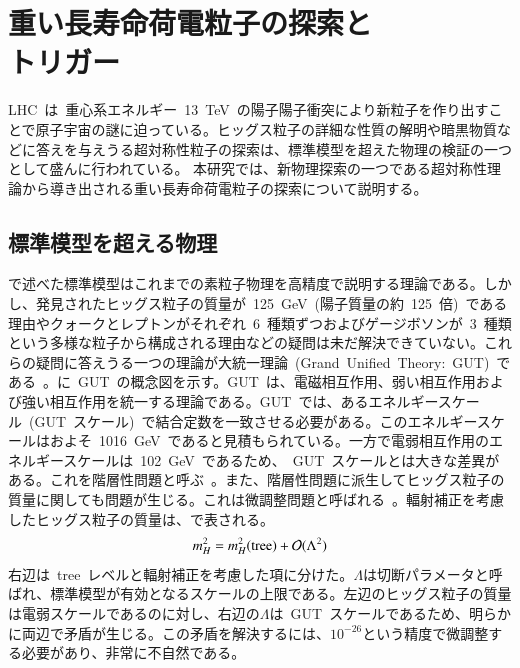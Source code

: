 \chapter[重い長寿命荷電粒子の探索とトリガー]{重い長寿命荷電粒子の探索と\\トリガー}
\thispagestyle{empty}
\label{chap:3}
LHC~は~重心系エネルギー~13~TeV~の陽子陽子衝突により新粒子を作り出すことで原子宇宙の謎に迫っている。ヒッグス粒子の詳細な性質の解明や暗黒物質などに答えを与えうる超対称性粒子の探索は、標準模型を超えた物理の検証の一つとして盛んに行われている。
本研究では、新物理探索の一つである超対称性理論から導き出される重い長寿命荷電粒子の探索について説明する。

\section{標準模型を超える物理}
\label{sec:BSM}
で述べた標準模型はこれまでの素粒子物理を高精度で説明する理論である。しかし、発見されたヒッグス粒子の質量が~125~GeV~(陽子質量の約~125~倍)~である理由やクォークとレプトンがそれぞれ~6~種類ずつおよびゲージボソンが~3~種類という多様な粒子から構成される理由などの疑問は未だ解決できていない。これらの疑問に答えうる一つの理論が大統一理論~(Grand~Unified~Theory:~GUT)~である~\cite{AR:10}。に~GUT~の概念図を示す。GUT~は、電磁相互作用、弱い相互作用および強い相互作用を統一する理論である。GUT~では、あるエネルギースケール~(GUT~スケール)~で結合定数を一致させる必要がある。このエネルギースケールはおよそ~1016~GeV~であると見積もられている。一方で電弱相互作用のエネルギースケールは~102~GeV~であるため、~GUT~スケールとは大きな差異がある。これを階層性問題と呼ぶ~\cite{AR:06}。また、階層性問題に派生してヒッグス粒子の質量に関しても問題が生じる。これは微調整問題と呼ばれる~\cite{AR:06}。輻射補正を考慮したヒッグス粒子の質量は、で表される。
\begin{align}
    m_{H}^2=m_{H}^2(\rm{tree})+\mathcal{O}(\Lambda^2) \label{eq:higgs}
\end{align}
右辺は~tree~レベルと輻射補正を考慮した項に分けた。$\Lambda$は切断パラメータと呼ばれ、標準模型が有効となるスケールの上限である。左辺のヒッグス粒子の質量は電弱スケールであるのに対し、右辺の$\Lambda$は~GUT~スケールであるため、明らかに両辺で矛盾が生じる。この矛盾を解決するには、$10^{-26}$という精度で微調整する必要があり、非常に不自然である。

